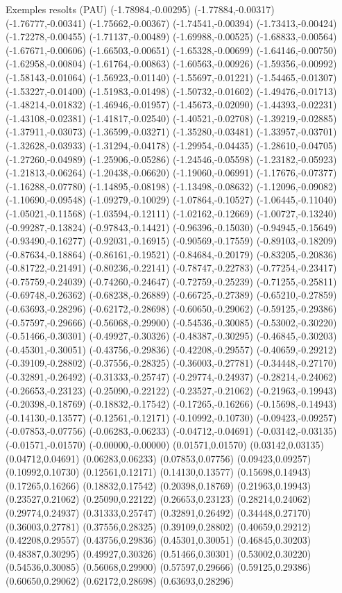 \documentclass[11pt,a4paper]{article}
\begin{document}
\begin{fmex}{Exemples resolts (PAU)}
(-1.78984,-0.00295) (-1.77884,-0.00317) (-1.76777,-0.00341) (-1.75662,-0.00367) (-1.74541,-0.00394) (-1.73413,-0.00424) (-1.72278,-0.00455) (-1.71137,-0.00489) (-1.69988,-0.00525) (-1.68833,-0.00564) (-1.67671,-0.00606) (-1.66503,-0.00651) (-1.65328,-0.00699) (-1.64146,-0.00750) (-1.62958,-0.00804) (-1.61764,-0.00863) (-1.60563,-0.00926) (-1.59356,-0.00992) (-1.58143,-0.01064) (-1.56923,-0.01140) (-1.55697,-0.01221) (-1.54465,-0.01307) (-1.53227,-0.01400) (-1.51983,-0.01498) (-1.50732,-0.01602) (-1.49476,-0.01713) (-1.48214,-0.01832) (-1.46946,-0.01957) (-1.45673,-0.02090) (-1.44393,-0.02231) (-1.43108,-0.02381) (-1.41817,-0.02540) (-1.40521,-0.02708) (-1.39219,-0.02885) (-1.37911,-0.03073) (-1.36599,-0.03271) (-1.35280,-0.03481) (-1.33957,-0.03701) (-1.32628,-0.03933) (-1.31294,-0.04178) (-1.29954,-0.04435) (-1.28610,-0.04705) (-1.27260,-0.04989) (-1.25906,-0.05286) (-1.24546,-0.05598) (-1.23182,-0.05923) (-1.21813,-0.06264) (-1.20438,-0.06620) (-1.19060,-0.06991) (-1.17676,-0.07377) (-1.16288,-0.07780) (-1.14895,-0.08198) (-1.13498,-0.08632) (-1.12096,-0.09082) (-1.10690,-0.09548) (-1.09279,-0.10029) (-1.07864,-0.10527) (-1.06445,-0.11040) (-1.05021,-0.11568) (-1.03594,-0.12111) (-1.02162,-0.12669) (-1.00727,-0.13240) (-0.99287,-0.13824) (-0.97843,-0.14421) (-0.96396,-0.15030) (-0.94945,-0.15649) (-0.93490,-0.16277) (-0.92031,-0.16915) (-0.90569,-0.17559) (-0.89103,-0.18209) (-0.87634,-0.18864) (-0.86161,-0.19521) (-0.84684,-0.20179) (-0.83205,-0.20836) (-0.81722,-0.21491) (-0.80236,-0.22141) (-0.78747,-0.22783) (-0.77254,-0.23417) (-0.75759,-0.24039) (-0.74260,-0.24647) (-0.72759,-0.25239) (-0.71255,-0.25811) (-0.69748,-0.26362) (-0.68238,-0.26889) (-0.66725,-0.27389) (-0.65210,-0.27859) (-0.63693,-0.28296) (-0.62172,-0.28698) (-0.60650,-0.29062) (-0.59125,-0.29386) (-0.57597,-0.29666) (-0.56068,-0.29900) (-0.54536,-0.30085) (-0.53002,-0.30220) (-0.51466,-0.30301) (-0.49927,-0.30326) (-0.48387,-0.30295) (-0.46845,-0.30203) (-0.45301,-0.30051) (-0.43756,-0.29836) (-0.42208,-0.29557) (-0.40659,-0.29212) (-0.39109,-0.28802) (-0.37556,-0.28325) (-0.36003,-0.27781) (-0.34448,-0.27170) (-0.32891,-0.26492) (-0.31333,-0.25747) (-0.29774,-0.24937) (-0.28214,-0.24062) (-0.26653,-0.23123) (-0.25090,-0.22122) (-0.23527,-0.21062) (-0.21963,-0.19943) (-0.20398,-0.18769) (-0.18832,-0.17542) (-0.17265,-0.16266) (-0.15698,-0.14943) (-0.14130,-0.13577) (-0.12561,-0.12171) (-0.10992,-0.10730) (-0.09423,-0.09257) (-0.07853,-0.07756) (-0.06283,-0.06233) (-0.04712,-0.04691) (-0.03142,-0.03135) (-0.01571,-0.01570) (-0.00000,-0.00000) (0.01571,0.01570) (0.03142,0.03135) (0.04712,0.04691) (0.06283,0.06233) (0.07853,0.07756) (0.09423,0.09257) (0.10992,0.10730) (0.12561,0.12171) (0.14130,0.13577) (0.15698,0.14943) (0.17265,0.16266) (0.18832,0.17542) (0.20398,0.18769) (0.21963,0.19943) (0.23527,0.21062) (0.25090,0.22122) (0.26653,0.23123) (0.28214,0.24062) (0.29774,0.24937) (0.31333,0.25747) (0.32891,0.26492) (0.34448,0.27170) (0.36003,0.27781) (0.37556,0.28325) (0.39109,0.28802) (0.40659,0.29212) (0.42208,0.29557) (0.43756,0.29836) (0.45301,0.30051) (0.46845,0.30203) (0.48387,0.30295) (0.49927,0.30326) (0.51466,0.30301) (0.53002,0.30220) (0.54536,0.30085) (0.56068,0.29900) (0.57597,0.29666) (0.59125,0.29386) (0.60650,0.29062) (0.62172,0.28698) (0.63693,0.28296) 
\end{fmex}
\end{document}
